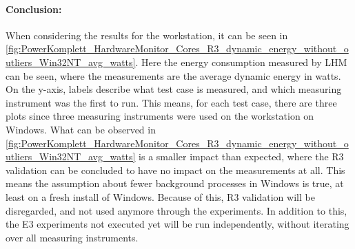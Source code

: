 \paragraph{Conclusion:} When considering the results for the workstation, it can be seen in \cref{fig:PowerKomplett_HardwareMonitor_Cores_R3_dynamic_energy_without_outliers_Win32NT_avg_watts}. Here the energy consumption measured by LHM can be seen, where the measurements are the average dynamic energy in watts. On the y-axis, labels describe what test case is measured, and which measuring instrument was the first to run. This means, for each test case, there are three plots since three measuring instruments were used on the workstation on Windows. What can be observed in \cref{fig:PowerKomplett_HardwareMonitor_Cores_R3_dynamic_energy_without_outliers_Win32NT_avg_watts} is a smaller impact than expected, where the R3 validation can be concluded to have no impact on the measurements at all. This means the assumption about fewer background processes in Windows is true, at least on a fresh install of Windows. Because of this, R3 validation will be disregarded, and not used anymore through the experiments. In addition to this, the E3 experiments not executed yet will be run independently, without iterating over all measuring instruments.
